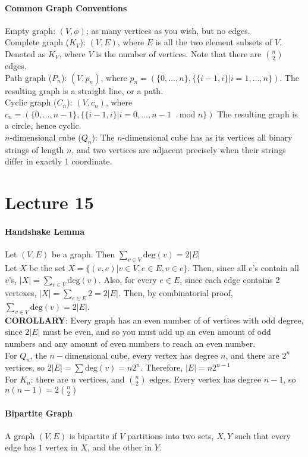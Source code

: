 \documentclass[10pt,letter]{article}
\begin{document}
\paragraph{Common Graph Conventions}
Empty graph: $(V,\phi)$; as many vertices as you wish, but no edges. \\ 
Complete graph ($K_V$): $(V,E)$, where $E$ is all the two element subsets of $V$. Denoted as $K_V$, where $V$ is the number of vertices. Note that there are ${n\choose 2}$ edges.\\ 
Path graph ($P_n$): $(V,p_n)$, where $p_n=(\{0,\ldots,n\},\{\{i-1,i\}|i=1,\ldots,n\})$. The resulting graph is a straight line, or a path.\\ 
Cyclic graph ($C_n$): $(V,c_n)$, where $c_n=(\{0,\ldots,n-1\},\{\{i-1,i\}|i=0,\ldots,n-1\quad\text{mod }n\})$ The resulting graph is a circle, hence cyclic. \\ 
$n$-dimensional cube ($Q_n$): The $n$-dimensional cube has as its vertices all binary strings of length $n$, and two vertices are adjacent precisely when their strings differ in exactly 1 coordinate. 

\section*{Lecture 15}
\paragraph{Handshake Lemma}
Let $(V,E)$ be a graph. Then $\sum_{v\in V}\text{deg}(v)=2|E|$ \\ 
Let $X$ be the set $X=\{(v,e)|v\in V,e\in E, v\in e\}$. Then, since all $e$'s contain all $v$'s, $|X|=\sum_{v\in V}\text{deg}(v)$. Also, for every $e\in E$, since each edge contains 2 vertexes, $|X|=\sum_{e\in E}2=2|E|$. Then, by combinatorial proof, $\sum_{v\in V}\text{deg}(v)=2|E|$. \\ 
\textbf{COROLLARY}: Every graph has an even number of of vertices with odd degree, since $2|E|$ must be even, and so you must add up an even amount of odd numbers and any amount of even numbers to reach an even number. \\ 
For $Q_n$, the $n-$dimensional cube, every vertex has degree $n$, and there are $2^n$ vertices, so $2|E|=\sum\text{deg}(v)=n2^n$. Therefore, $|E|=n2^{n-1}$ \\ 
For $K_n$: there are $n$ vertices, and ${n\choose2}$ edges. Every vertex has degree $n-1$, so $n(n-1)=2{n\choose 2}$ 

\paragraph{Bipartite Graph}
A graph $(V,E)$ is bipartite if $V$ partitions into two sets, $X,Y$ such that every edge has $1$ vertex in $X$, and the other in $Y$. 
\end{document}
